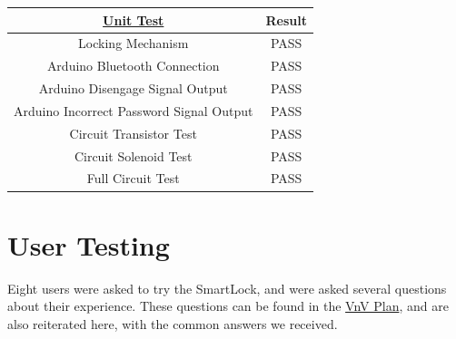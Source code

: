 \documentclass[12pt, titlepage]{article}
\begin{document}
\begin{center}

\begin{tabular}{|c|c|}
  \hline
  \textbf{\href{https://github.com/NevoAbigail/Capstone/blob/main/docs/VnVPlan/VnVPlan.pdf}{Unit Test}} & \textbf{Result} \\
  \hline
  Locking Mechanism & PASS\\
  \hline
  Arduino Bluetooth Connection & PASS\\
  \hline
  Arduino Disengage Signal Output & PASS\\
  \hline
  Arduino Incorrect Password Signal Output & PASS \\
  \hline
  Circuit Transistor Test & PASS \\
  \hline
  Circuit Solenoid Test & PASS \\
  \hline
  Full Circuit Test & PASS \\
  \hline
  
\end{tabular}
\end{center}

\section{User Testing} \label{User Testing}

Eight users were asked to try the SmartLock, and were asked several questions about their experience. These questions can be found in the \href{https://github.com/NevoAbigail/Capstone/blob/main/docs/VnVPlan/VnVPlan.pdf}{VnV Plan}, and are also reiterated here, with the common answers we received.
\end{document}
